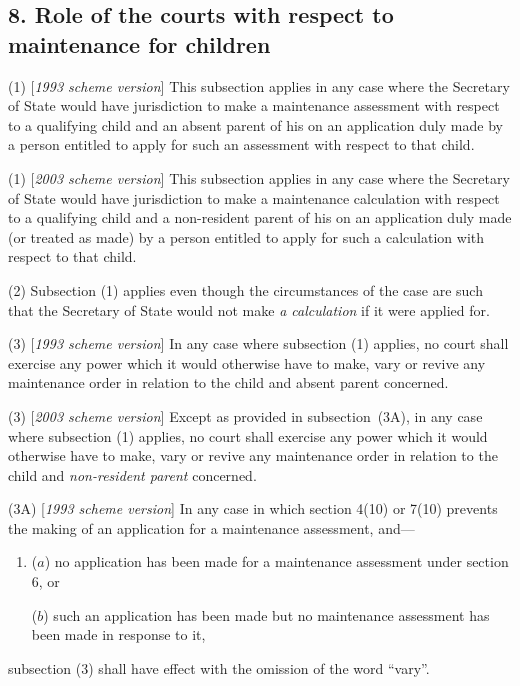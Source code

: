 \documentclass[12pt,a4paper]{article}
\begin{document}
\subsection{8. Role of the courts with respect to maintenance for children}

(1) [\emph{1993 scheme version}] This subsection applies in any case where 
the Secretary of State  %
would have jurisdiction to make a maintenance assessment with respect to a qualifying child and an absent parent of his on an application duly made by a person entitled to apply for such an assessment with respect to that child.

(1) [\emph{2003 scheme version}] This subsection applies in any case where 
the Secretary of State  %
would have jurisdiction to make a 
maintenance calculation  %
with respect to a qualifying child and 
a non-resident parent  %
of his on an application duly made 
(or treated as made)  %
by a person entitled to apply for such 
a calculation  %
with respect to that child.

(2) Subsection (1)  applies even though the circumstances of the case are such that
the Secretary of State  %
would not make 
\emph{a calculation}  %
if it were applied for.

(3) [\emph{1993 scheme version}] In any case where subsection (1)  applies, no court shall exercise any power which it would otherwise have to make, vary or revive any maintenance order in relation to the child and absent parent concerned.

(3) [\emph{2003 scheme version}] 
Except as provided in subsection~(3A),  %
in any case where subsection (1)  applies, no court shall exercise any power which it would otherwise have to make, vary or revive any maintenance order in relation to the child and 
\emph{non-resident parent}  %
concerned.

(3A) [\emph{1993 scheme version}] In any case in which section 4(10) or 7(10) prevents the making of an application for a maintenance assessment, and—
\begin{enumerate}\item[]
($a$) no application has been made for a maintenance assessment under section 6, or

($b$) such an application has been made but no maintenance assessment has been made in response to it,
\end{enumerate}
subsection (3) shall have effect with the omission of the word “vary”.
\end{document}
